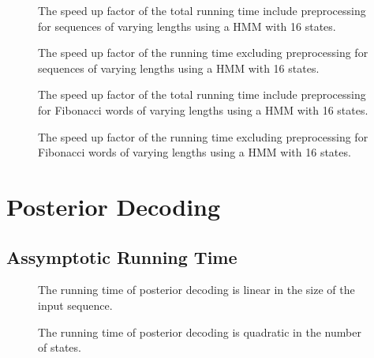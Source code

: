 \begin{figure}[H]
  \centering
  
  \caption{The speed up factor of the total running time include preprocessing
    for sequences of varying lengths using a HMM with 16 states.}
  \label{fig:speedup_vs_sequence_length}
\end{figure}

\begin{figure}[H]
  \centering
  
  \caption{The speed up factor of the running time excluding preprocessing for
    sequences of varying lengths using a HMM with 16 states.}
  \label{fig:speedup_vs_sequence_length2}
\end{figure}

\begin{figure}[H]
  \centering
  
  \caption{The speed up factor of the total running time include preprocessing
    for Fibonacci words of varying lengths using a HMM with 16 states.}
  \label{fig:fib_speedup_vs_sequence_length}
\end{figure}

\begin{figure}[H]
  \centering
  
  \caption{The speed up factor of the running time excluding preprocessing for
    Fibonacci words of varying lengths using a HMM with 16 states.}
  \label{fig:fib_speedup_vs_sequence_length2}
\end{figure}

\section{Posterior Decoding}
\label{sec:posterior-decoding}

\subsection{Assymptotic Running Time}
\label{sec:assympt-runn-time}

\begin{figure}[H]
  \centering
  
  \caption{The running time of posterior decoding is linear in the size of the
    input sequence.}
  \label{fig:posterior_n}
\end{figure}

\begin{figure}[H]
  \centering
  
  \caption{The running time of posterior decoding is quadratic in the number of
    states.}
  \label{fig:posterior_k}
\end{figure}

